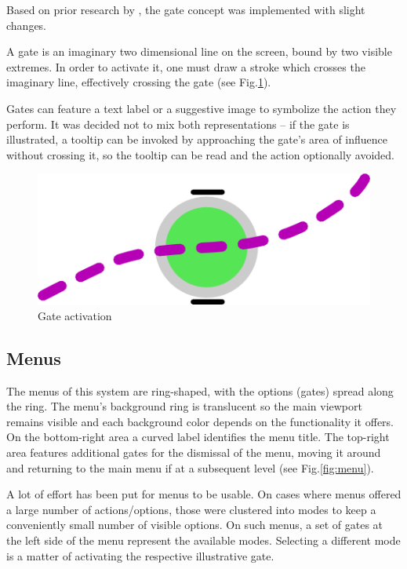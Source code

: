 Based on prior research by \cite{CROSSY}, the gate concept was implemented with slight changes.

A gate is an imaginary two dimensional line on the screen, bound by two visible extremes.
In order to activate it, one must draw a stroke which crosses the imaginary line, effectively crossing the gate
(see Fig.\ref{fig:activation}).

Gates can feature a text label or a suggestive image to symbolize the action they perform.
It was decided not to mix both representations -- if the gate is illustrated, a tooltip can be invoked
by approaching the gate's area of influence without crossing it, so the tooltip can be read and the action optionally avoided.

\begin{figure}[ht]
	\centering
		\includegraphics{gfx/activation.png}
		\caption{Gate activation}
	\label{fig:activation}
\end{figure}



\subsection{Menus}

The menus of this system are ring-shaped, with the options (gates) spread along the ring.
The menu's background ring is translucent so the main viewport remains visible and each background color
depends on the functionality it offers.
On the bottom-right area a curved label identifies the menu title.
The top-right area features additional gates for the dismissal of the menu, moving it around and
returning to the main menu if at a subsequent level (see Fig.\ref{fig:menu}).

A lot of effort has been put for menus to be usable. On cases where menus offered a large number of actions/options,
those were clustered into modes to keep a conveniently small number of visible options.
On such menus, a set of gates at the left side of the menu represent the available modes.
Selecting a different mode is a matter of activating the respective illustrative gate.


